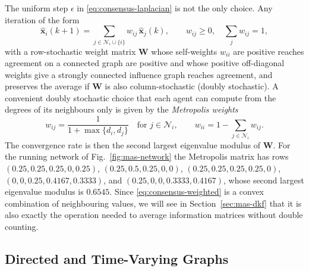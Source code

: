 \documentclass[graybox,envcountchap]{style/SNmono}
\providecommand{\DIFadd}[1]{{\protect\color{blue} #1}} %
\providecommand{\DIFdel}[1]{{\protect\color{red} #1}} %
\providecommand{\DIFaddbegin}{} %
\providecommand{\DIFaddend}{} %
\providecommand{\DIFdelbegin}{} %
\providecommand{\DIFdelend}{} %
\begin{document}
The uniform step $\epsilon$ in \eqref{eq:consensus-laplacian} is not the only choice. Any iteration of the form
\begin{equation}
\widehat{\mathbf{x}}_i(k+1)=\sum_{j\in\mathcal{N}_i\cup\{i\}}w_{ij}\,\widehat{\mathbf{x}}_j(k),\qquad w_{ij}\ge0,\quad \sum_{j}w_{ij}=1,
\label{eq:consensus-weighted}
\end{equation}
with a row-stochastic weight matrix $\mathbf{W}$ whose self-weights \DIFdelbegin \DIFdel{$w_{ii}$ are positive reaches agreement on a connected graph}\DIFdelend \DIFaddbegin \DIFadd{are positive and whose positive off-diagonal weights give a strongly connected influence graph reaches agreement}\DIFaddend , and preserves the average if $\mathbf{W}$ is also column-stochastic (doubly stochastic). A convenient doubly stochastic choice that each agent can compute from the degrees of its neighbours only is given by the \emph{Metropolis weights} \cite{xiao2005_distributed_fusion}
\begin{equation}
w_{ij}=\frac{1}{1+\max\{d_i,d_j\}}\quad\text{for } j\in\mathcal{N}_i,\qquad
w_{ii}=1-\sum_{j\in\mathcal{N}_i}w_{ij}.
\label{eq:metropolis-weights}
\end{equation}
The convergence rate is then the second largest eigenvalue modulus of $\mathbf{W}$. For the running network of Fig.~\ref{fig:mas-network} the Metropolis matrix has rows $(0.25,\allowbreak 0.25,\allowbreak 0.25,\allowbreak 0,\allowbreak 0.25)$, $(0.25,\allowbreak 0.5,\allowbreak 0.25,\allowbreak 0,\allowbreak 0)$, $(0.25,\allowbreak 0.25,\allowbreak 0.25,\allowbreak 0.25,\allowbreak 0)$, $(0,\allowbreak 0,\allowbreak 0.25,\allowbreak 0.4167,\allowbreak 0.3333)$, and $(0.25,\allowbreak 0,\allowbreak 0,\allowbreak 0.3333,\allowbreak 0.4167)$, whose second largest eigenvalue modulus is $0.6545$. Since \eqref{eq:consensus-weighted} is a convex combination of neighbouring values, we will see in Section~\ref{sec:mas-dkf} that it is also exactly the operation needed to average information matrices without double counting.

\subsection{Directed and Time-Varying Graphs}
\label{subsec:mas-directed}
\end{document}
